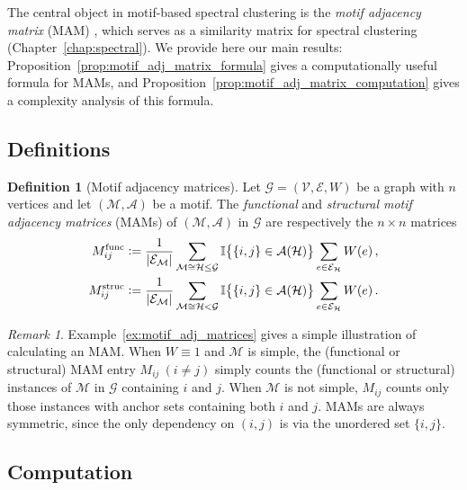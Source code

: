 \documentclass[12pt]{ociamthesis}
\theoremstyle{plain}
\theoremstyle{definition}
\newtheorem{definition}{Definition}[chapter]
\theoremstyle{remark}
\newtheorem*{remark}{Remark}
\newcommand\bb[1]{\mathbb{#1}}
\newcommand\ca[1]{\mathcal{#1}}
\begin{document}
The central object in motif-based spectral clustering is the \emph{motif
adjacency matrix} (MAM) \cite{benson2016higher}, which serves as a similarity
matrix for spectral clustering (Chapter~\ref{chap:spectral}).
We provide here our main results:
Proposition~\ref{prop:motif_adj_matrix_formula} gives a computationally useful
formula for MAMs, and Proposition~\ref{prop:motif_adj_matrix_computation} gives
a complexity analysis of this formula.

\pagebreak

\subsection{Definitions}

\begin{definition}[Motif adjacency matrices] \label{def:motif_adj_matrices}
%
Let $\ca{G} = (\ca{V,E},W)$ be a graph with $n$ vertices and let $\ca{(M,A)}$
be a motif. The \emph{functional} and \emph{structural motif adjacency
matrices} (MAMs) of $\ca{(M,A)}$ in $\ca{G}$ are respectively the $n \times
n$ matrices
%
\begin{align*}
M^\mathrm{func}_{i j} &\vcentcolon= \frac{1}{|\ca{E_M}|} \sum_{\ca{M} \cong
\ca{H} \leq \ca{G}} \bb{I} \big\{ \{i,j\} \in \ca{A}(\ca{H}) \big\} \sum_{e
\in \ca{E_H}} W(e)\,, \\
M^\mathrm{struc}_{i j} &\vcentcolon= \frac{1}{|\ca{E_M}|} \sum_{\ca{M} \cong
\ca{H} < \ca{G}} \bb{I} \big\{ \{i,j\} \in \ca{A}(\ca{H}) \big\} \sum_{e
\in \ca{E_H}} W(e)\,.
\end{align*}
\end{definition}

\begin{remark}
Example~\ref{ex:motif_adj_matrices} gives a simple illustration of
calculating an MAM.
When $W \equiv 1$ and $\ca{M}$ is simple, the (functional or structural) MAM
entry $M_{i j} \ (i \neq j)$ simply counts the (functional or structural)
instances of $\ca{M}$ in $\ca{G}$ containing $i$ and $j$.
When $\ca{M}$ is not simple, $M_{i j}$ counts only those instances with anchor
sets containing both $i$ and $j$.
MAMs are always symmetric, since the only dependency on $(i,j)$ is via the
unordered set $\{i,j\}$.
\end{remark}

\subsection{Computation} \label{sec:graphs_computation}
\end{document}
